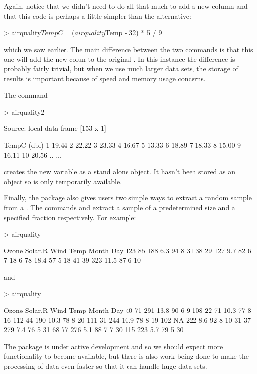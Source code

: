 Again, notice that we didn't need to do all that much to add a new column and that this code is perhaps a little simpler than the alternative:
\begin{Schunk}
\begin{Sinput}
> airquality$TempC = (airquality$Temp - 32) * 5 / 9
\end{Sinput}
\end{Schunk}
which we saw earlier. The main difference between the two commands is that this one will add the new colun to the original .
In this instance the difference is probably fairly trivial, but when we use much larger data sets, the storage of results is important because of speed and memory usage concerns.

The command
\begin{Schunk}
\begin{Sinput}
> airquality2 %>% transmute(TempC = (Temp - 32) * 5 / 9)
\end{Sinput}
\begin{Soutput}
Source: local data frame [153 x 1]

   TempC
   (dbl)
1  19.44
2  22.22
3  23.33
4  16.67
5  13.33
6  18.89
7  18.33
8  15.00
9  16.11
10 20.56
..   ...
\end{Soutput}
\end{Schunk}
creates the new variable as a stand alone object. It hasn't been stored as an object so is only temporarily available. 

Finally, the  package also gives users two simple ways to extract a random sample from a . The commands  and  
extract a sample of a predetermined size and a specified fraction respectively. For example:
\begin{Schunk}
\begin{Sinput}
> airquality %>% sample_n(4)
\end{Sinput}
\begin{Soutput}
    Ozone Solar.R Wind Temp Month Day
123    85     188  6.3   94     8  31
38     29     127  9.7   82     6   7
18      6      78 18.4   57     5  18
41     39     323 11.5   87     6  10
\end{Soutput}
\end{Schunk}
and
\begin{Schunk}
\begin{Sinput}
> airquality %>% sample_frac(0.05)
\end{Sinput}
\begin{Soutput}
    Ozone Solar.R Wind Temp Month Day
40     71     291 13.8   90     6   9
108    22      71 10.3   77     8  16
112    44     190 10.3   78     8  20
111    31     244 10.9   78     8  19
102    NA     222  8.6   92     8  10
31     37     279  7.4   76     5  31
68     77     276  5.1   88     7   7
30    115     223  5.7   79     5  30
\end{Soutput}
\end{Schunk}

The   package is under active development and so we should expect more functionality to become available, but there is also work being done to make the processing of data even faster so that it can handle huge data sets.


